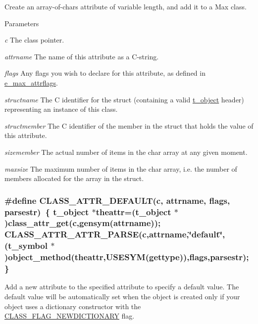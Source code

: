 Create an array-\/of-\/chars attribute of variable length, and add it to a Max class. 
\begin{DoxyParams}{Parameters}
\item[{\em c}]The class pointer. \item[{\em attrname}]The name of this attribute as a C-\/string. \item[{\em flags}]Any flags you wish to declare for this attribute, as defined in \hyperlink{group__attr_gaf296cfc6741bb19207f6ed8062809115}{e\_\-max\_\-attrflags}. \item[{\em structname}]The C identifier for the struct (containing a valid \hyperlink{structt__object}{t\_\-object} header) representing an instance of this class. \item[{\em structmember}]The C identifier of the member in the struct that holds the value of this attribute. \item[{\em sizemember}]The actual number of items in the char array at any given moment. \item[{\em maxsize}]The maximum number of items in the char array, i.e. the number of members allocated for the array in the struct. \end{DoxyParams}
\hypertarget{group__attr_ga91196b43f49d6769e6fe2df99f5c7c77}{
\subsubsection[{CLASS\_\-ATTR\_\-DEFAULT}]{\setlength{\rightskip}{0pt plus 5cm}\#define CLASS\_\-ATTR\_\-DEFAULT(c, \/  attrname, \/  flags, \/  parsestr)~\{ {\bf t\_\-object} $\ast$theattr=({\bf t\_\-object} $\ast$)class\_\-attr\_\-get(c,gensym(attrname)); CLASS\_\-ATTR\_\-ATTR\_\-PARSE(c,attrname,\char`\"{}default\char`\"{},(t\_\-symbol $\ast$)object\_\-method(theattr,USESYM(gettype)),flags,parsestr); \}}}
\label{group__attr_ga91196b43f49d6769e6fe2df99f5c7c77}


Add a new attribute to the specified attribute to specify a default value. The default value will be automatically set when the object is created only if your object uses a dictionary constructor with the \hyperlink{group__class_gga124a08e1744d9e999211abaa9df9f556aab2bebd8a64110247fa11db1c13ca5eb}{CLASS\_\-FLAG\_\-NEWDICTIONARY} flag.


